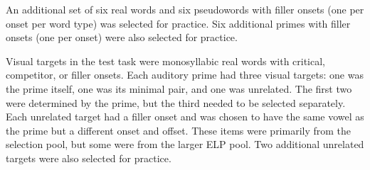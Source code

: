 \documentclass[
  12pt,
  twoside]{article}
\begin{document}
\begin{table}

\caption{\label{tab:spk-vot-tab}Mean, standard deviation, and range of VOTs by onset by talker.}
\centering
{}
\end{table}

An additional set of six real words and six pseudowords with filler onsets (one per onset per word type) was selected for practice.
Six additional primes with filler onsets (one per onset) were also selected for practice.

Visual targets in the test task were monosyllabic real words with critical, competitor, or filler onsets.
Each auditory prime had three visual targets: one was the prime itself, one was its minimal pair, and one was unrelated.
The first two were determined by the prime, but the third needed to be selected separately.
Each unrelated target had a filler onset and was chosen to have the same vowel as the prime but a different onset and offset.
These items were primarily from the selection pool, but some were from the larger ELP pool.
Two additional unrelated targets were also selected for practice.
\end{document}
